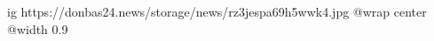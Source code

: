 
 
 
 
 

\ifcmt
  ig https://donbas24.news/storage/news/rz3jespa69h5wwk4.jpg
  @wrap center
  @width 0.9
\fi
